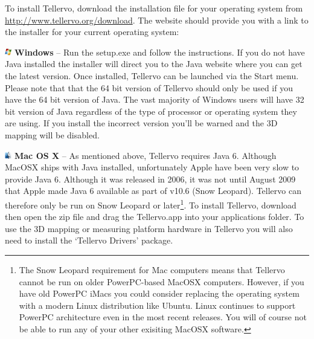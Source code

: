 To install Tellervo, download the installation file for your operating system from \url{http://www.tellervo.org/download}. The website should provide you with a link to the installer for your current operating system:

\begin{description}
\item \includegraphics[width=3mm]{Images/windows.png} \textbf{Windows} -- Run the setup.exe and follow the instructions. If you do not have Java installed the installer will direct you to the Java website where you can get the latest version. Once installed, Tellervo can be launched via the Start menu.  Please note that that the 64 bit version of Tellervo should only be used if you have the 64 bit version of Java.  The vast majority of Windows users will have 32 bit version of Java regardless of the type of processor or operating system they are using. If you install the incorrect version you'll be warned and the 3D mapping will be disabled.

\item \includegraphics[width=3mm]{Images/mac.png} \textbf{Mac OS X} -- As mentioned above, Tellervo requires Java 6. Although MacOSX ships with Java installed, unfortunately Apple have been very slow to provide Java 6. Although it was released in 2006, it was not until August 2009 that Apple made Java 6 available as part of v10.6 (Snow Leopard). Tellervo can therefore only be run on Snow Leopard or later\footnote{The Snow Leopard requirement for Mac computers means that Tellervo cannot be run on older PowerPC-based MacOSX computers.  However, if you have old PowerPC iMacs you could consider replacing the operating system with a modern Linux distribution like Ubuntu.  Linux continues to support PowerPC architecture even in the most recent releases.  You will of course not be able to run any of your other exisiting MacOSX software.}. To install Tellervo, download then open the zip file and drag the Tellervo.app into your applications folder.  To use the 3D mapping or measuring platform hardware in Tellervo you 
will also need to install the `Tellervo Drivers' package.  


\end{description}
